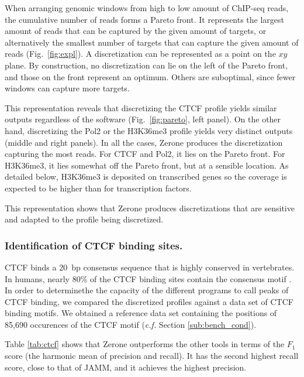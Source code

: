 \documentclass{bioinfo}
\begin{document}
When arranging genomic windows from high to low amount of ChIP-seq
reads, the cumulative number of reads forms a Pareto front.
It represents the largest amount of reads that can be captured by the
given amount of targets, or alternatively the smallest number of
targets that can capture the given amount of reads
(Fig.~\ref{fig:expl}). A discretization can be represented as a point
on the $xy$ plane.  By construction, no discretization can lie on the
left of the Pareto front, and those on the front represent an
optimum. Others are suboptimal, since fewer windows can capture more
targets.

This representation reveals that discretizing the CTCF profile yields
similar outputs regardless of the software (Fig.~\ref{fig:pareto},
left panel). On the other hand, discretizing the Pol2 or the H3K36me3
profile yields very distinct outputs (middle and right panels). In
all the cases, Zerone produces the discretization capturing the most
reads. For CTCF and Pol2, it lies on the Pareto front. For H3K36me3,
it lies somewhat off the Pareto front, but at a sensible location.
As detailed below, H3K36me3 is deposited on transcribed genes
\citep{pmid16122420,pmid23739122} so the coverage is expected to
be higher than for transcription factors.

This representation shows that Zerone produces discretizations that
are sensitive and adapted to the profile being discretized.

\subsubsection{Identification of CTCF binding sites.}
CTCF binds a 20~bp consensus sequence that is highly conserved in
vertebrates. In humans, nearly 80\% of the CTCF binding sites contain
the consensus motif \citep{pmid17382889}. In order to determinethe the
capacity of the different programs to call peaks of CTCF binding, we
compared the discretized profiles against a data set of CTCF binding
motifs. We obtained a reference data set containing the positions of
85,690 occurences of the CTCF motif (\textit{c.f.} Section
\ref{sub:bench_cond}).

Table \ref{tab:ctcf} shows that Zerone outperforms the other tools
in terms of the $F_1$ score (the harmonic mean of precision and
recall). It has the second highest recall score, close to that of JAMM,
and it achieves the highest precision.
\end{document}
